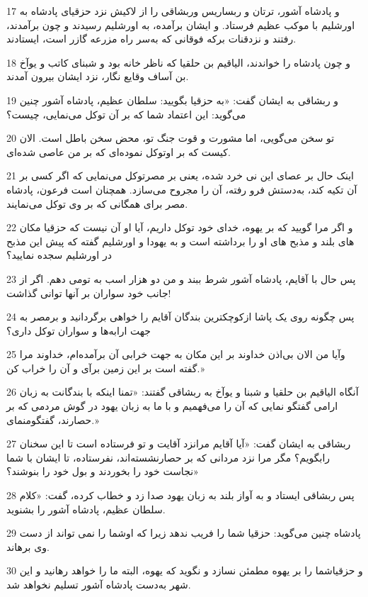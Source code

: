 \par 17 و پادشاه آشور، ترتان و ربساریس وربشاقی را از لاکیش نزد حزقیای پادشاه به اورشلیم با موکب عظیم فرستاد. و ایشان برآمده، به اورشلیم رسیدند و چون برآمدند، رفتند و نزدقنات برکه فوقانی که به‌سر راه مزرعه گازر است، ایستادند.
\par 18 و چون پادشاه را خواندند، الیاقیم بن حلقیا که ناظر خانه بود و شبنای کاتب و یوآخ بن آساف وقایع نگار، نزد ایشان بیرون آمدند.
\par 19 و ربشاقی به ایشان گفت: «به حزقیا بگویید: سلطان عظیم، پادشاه آشور چنین می‌گوید: این اعتماد شما که بر آن توکل می‌نمایی، چیست؟
\par 20 تو سخن می‌گویی، اما مشورت و قوت جنگ تو، محض سخن باطل است. الان کیست که بر اوتوکل نموده‌ای که بر من عاصی شده‌ای.
\par 21 اینک حال بر عصای این نی خرد شده، یعنی بر مصرتوکل می‌نمایی که اگر کسی بر آن تکیه کند، به‌دستش فرو رفته، آن را مجروح می‌سازد. همچنان است فرعون، پادشاه مصر برای همگانی که بر وی توکل می‌نمایند.
\par 22 و اگر مرا گویید که بر یهوه، خدای خود توکل داریم، آیا او آن نیست که حزقیا مکان های بلند و مذبح های او را برداشته است و به یهودا و اورشلیم گفته که پیش این مذبح در اورشلیم سجده نمایید؟
\par 23 پس حال با آقایم، پادشاه آشور شرط ببند و من دو هزار اسب به تومی دهم. اگر از جانب خود سواران بر آنها توانی گذاشت!
\par 24 پس چگونه روی یک پاشا ازکوچکترین بندگان آقایم را خواهی برگردانید و برمصر به جهت ارابه‌ها و سواران توکل داری؟
\par 25 وآیا من الان بی‌اذن خداوند بر این مکان به جهت خرابی آن برآمده‌ام، خداوند مرا گفته است بر این زمین برآی و آن را خراب کن.»
\par 26 آنگاه الیاقیم بن حلقیا و شبنا و یوآخ به ربشاقی گفتند: «تمنا اینکه با بندگانت به زبان ارامی گفتگو نمایی که آن را می‌فهمیم و با ما به زبان یهود در گوش مردمی که بر حصارند، گفتگومنمای.»
\par 27 ربشاقی به ایشان گفت: «آیا آقایم مرانزد آقایت و تو فرستاده است تا این سخنان رابگویم؟ مگر مرا نزد مردانی که بر حصارنشسته‌اند، نفرستاده، تا ایشان با شما نجاست خود را بخوردند و بول خود را بنوشند؟»
\par 28 پس ربشاقی ایستاد و به آواز بلند به زبان یهود صدا زد و خطاب کرده، گفت: «کلام سلطان عظیم، پادشاه آشور را بشنوید.
\par 29 پادشاه چنین می‌گوید: حزقیا شما را فریب ندهد زیرا که اوشما را نمی تواند از دست وی برهاند.
\par 30 و حزقیاشما را بر یهوه مطمئن نسازد و نگوید که یهوه، البته ما را خواهد رهانید و این شهر به‌دست پادشاه آشور تسلیم نخواهد شد.
